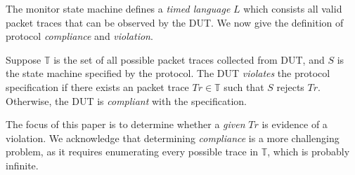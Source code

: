 The monitor state machine defines a \textit{timed language} $L$ which consists
all valid packet traces that can be observed by the DUT.
%
We now give the
definition of protocol \textit{compliance} and \textit{violation}.

\begin{definition}
  Suppose $\mathbb{T}$ is the set of all possible packet traces collected from
  DUT, and $S$ is the state machine specified by the protocol. The DUT
  \textit{violates} the protocol specification if there exists an
  packet trace $Tr \in \mathbb{T}$ such that $S$ rejects $Tr$.
  Otherwise, the DUT is \textit{compliant} with the specification.
\end{definition}

The focus of this paper is to determine whether a \textit{given} $Tr$ is
evidence of a violation.
%
We acknowledge that determining \textit{compliance} is a more challenging
problem, as it requires enumerating every possible trace in $\mathbb{T}$, which
is probably infinite.
